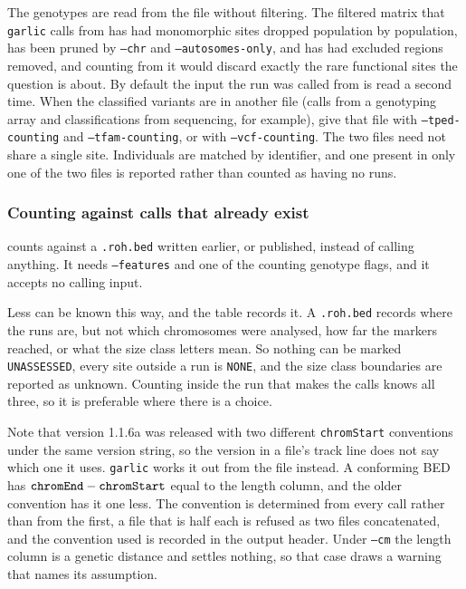 \documentclass[12pt]{article}%
\begin{document}
The genotypes are read from the file without filtering.  The filtered matrix
that {\tt garlic} calls from has had monomorphic sites dropped population by
population, has been pruned by {\tt --chr} and {\tt --autosomes-only}, and has
had excluded regions removed, and counting from it would discard exactly the
rare functional sites the question is about.  By default the input the run was
called from is read a second time.  When the classified variants are in
another file (calls from a genotyping array and classifications from
sequencing, for example), give that file with {\tt --tped-counting} and
{\tt --tfam-counting}, or with {\tt --vcf-counting}.  The two files need not
share a single site.  Individuals are matched by identifier, and one present in
only one of the two files is reported rather than counted as having no runs.

\subsubsection{Counting against calls that already exist}

 counts against a {\tt .roh.bed} written earlier, or
published, instead of calling anything. It needs {\tt --features} and one of
the counting genotype flags, and it accepts no calling input.

Less can be known this way, and the table records it.  A {\tt .roh.bed}
records where the runs are, but not which chromosomes were analysed, how far
the markers reached, or what the size class letters mean.  So nothing can be
marked {\tt UNASSESSED}, every site outside a run is {\tt NONE}, and the size
class boundaries are reported as unknown.  Counting inside the run that makes
the calls knows all three, so it is preferable where there is a choice.

Note that version 1.1.6a was released with two different {\tt chromStart}
conventions under the same version string, so the version in a file's track
line does not say which one it uses.  {\tt garlic} works it out from the file
instead.  A conforming BED has ${\tt chromEnd} - {\tt chromStart}$ equal to the
length column, and the older convention has it one less.  The convention is
determined from every call rather than from the first, a file that is half
each is refused as two files concatenated, and the convention used is recorded
in the output header.  Under {\tt --cm} the length column is a genetic distance
and settles nothing, so that case draws a warning that names its
assumption.
\end{document}
